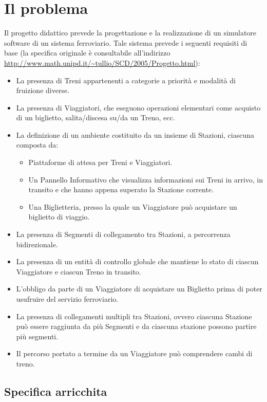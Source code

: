 \chapter{Il problema}

Il progetto didattico prevede la progettazione e la realizzazione di un simulatore software di un sistema ferroviario. Tale sistema prevede i seguenti requisiti di base (la specifica originale è consultabile all'indirizzo \url{http://www.math.unipd.it/~tullio/SCD/2005/Progetto.html}):
	\begin{itemize}
		\item La presenza di Treni appartenenti a categorie a priorità e modalità di fruizione diverse. 
		\item La presenza di Viaggiatori, che eseguono operazioni elementari come acquisto di un biglietto, salita/discesa su/da un Treno, ecc.
		\item La definizione di un ambiente costituito da un insieme di Stazioni, ciascuna composta da:
			\begin{itemize}
				\item Piattaforme di attesa per Treni e Viaggiatori.
				\item Un Pannello Informativo che visualizza informazioni sui Treni in arrivo, in transito e che hanno appena superato la Stazione corrente.
				\item Una Biglietteria, presso la quale un Viaggiatore può acquistare un biglietto di viaggio.
			\end{itemize}
		\item La presenza di Segmenti di collegamento tra Stazioni, a percorrenza bidirezionale.
		\item La presenza di un entità di controllo globale che mantiene lo stato di ciascun Viaggiatore e ciascun Treno in transito.
		\item L'obbligo da parte di un Viaggiatore di acquistare un Biglietto prima di poter usufruire del servizio ferroviario.
		\item La presenza di collegamenti multipli tra Stazioni, ovvero ciascuna Stazione può essere raggiunta da più Segmenti e da ciascuna stazione possono partire più segmenti.
		\item Il percorso portato a termine da un Viaggiatore può comprendere cambi di treno.
	\end{itemize}

\section{Specifica arricchita}


